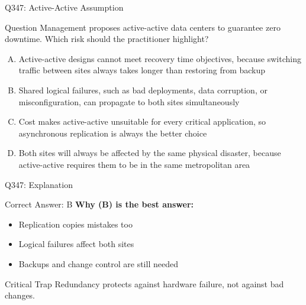 \documentclass{beamer}
\begin{document}
	\begin{frame}{Q347: Active-Active Assumption}
		\begin{block}{Question}
			\small Management proposes active-active data centers to guarantee zero downtime. Which risk should the practitioner highlight?
		\end{block}
		\begin{enumerate}[(A)]
			\footnotesize
			\item Active-active designs cannot meet recovery time objectives, because switching traffic between sites always takes longer than restoring from backup
			\item Shared logical failures, such as bad deployments, data corruption, or misconfiguration, can propagate to both sites simultaneously
			\item Cost makes active-active unsuitable for every critical application, so asynchronous replication is always the better choice
			\item Both sites will always be affected by the same physical disaster, because active-active requires them to be in the same metropolitan area
		\end{enumerate}
	\end{frame}
	
	\begin{frame}{Q347: Explanation}
		\begin{block}{Correct Answer: B}
			\textbf{Why (B) is the best answer:}
			\begin{itemize}
				\item Replication copies mistakes too
				\item Logical failures affect both sites
				\item Backups and change control are still needed
			\end{itemize}
		\end{block}
		\begin{alertblock}{Critical Trap}
			Redundancy protects against hardware failure, not against bad changes.
		\end{alertblock}
	\end{frame}
	
\end{document}
